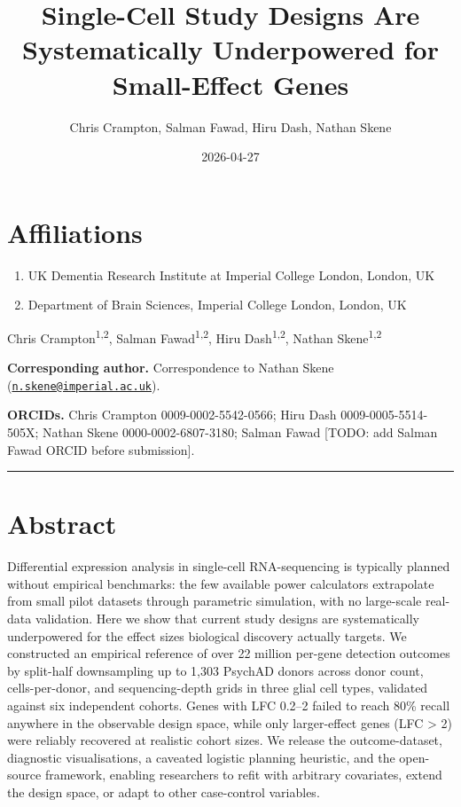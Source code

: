 \documentclass[
]{article}
\title{Single-Cell Study Designs Are Systematically Underpowered for
Small-Effect Genes}
\author{Chris Crampton, Salman Fawad, Hiru Dash, Nathan Skene}
\date{2026-04-27}
\providecommand{\tightlist}{%
  \setlength{\itemsep}{0pt}\setlength{\parskip}{0pt}}
\begin{document}
\maketitle

\section{Affiliations}\label{affiliations}

\begin{enumerate}
\def\labelenumi{\arabic{enumi}.}
\tightlist
\item
  UK Dementia Research Institute at Imperial College London, London, UK
\item
  Department of Brain Sciences, Imperial College London, London, UK
\end{enumerate}

Chris Crampton\textsuperscript{1,2}, Salman Fawad\textsuperscript{1,2},
Hiru Dash\textsuperscript{1,2}, Nathan Skene\textsuperscript{1,2}

\textbf{Corresponding author.} Correspondence to Nathan Skene
(\href{mailto:n.skene@imperial.ac.uk}{\nolinkurl{n.skene@imperial.ac.uk}}).

\textbf{ORCIDs.} Chris Crampton 0009-0002-5542-0566; Hiru Dash
0009-0005-5514-505X; Nathan Skene 0000-0002-6807-3180; Salman Fawad
{[}TODO: add Salman Fawad ORCID before submission{]}.

\begin{center}\rule{0.5\linewidth}{0.5pt}\end{center}

\section{Abstract}\label{abstract}

Differential expression analysis in single-cell RNA-sequencing is
typically planned without empirical benchmarks: the few available power
calculators extrapolate from small pilot datasets through parametric
simulation, with no large-scale real-data validation. Here we show that
current study designs are systematically underpowered for the effect
sizes biological discovery actually targets. We constructed an empirical
reference of over 22 million per-gene detection outcomes by split-half
downsampling up to 1,303 PsychAD donors across donor count,
cells-per-donor, and sequencing-depth grids in three glial cell types,
validated against six independent cohorts. Genes with
\textbar LFC\textbar{} 0.2--2 failed to reach 80\% recall anywhere in
the observable design space, while only larger-effect genes
(\textbar LFC\textbar{} \textgreater{} 2) were reliably recovered at
realistic cohort sizes. We release the outcome-dataset, diagnostic
visualisations, a caveated logistic planning heuristic, and the
open-source framework, enabling researchers to refit with arbitrary
covariates, extend the design space, or adapt to other case-control
variables.
\end{document}
